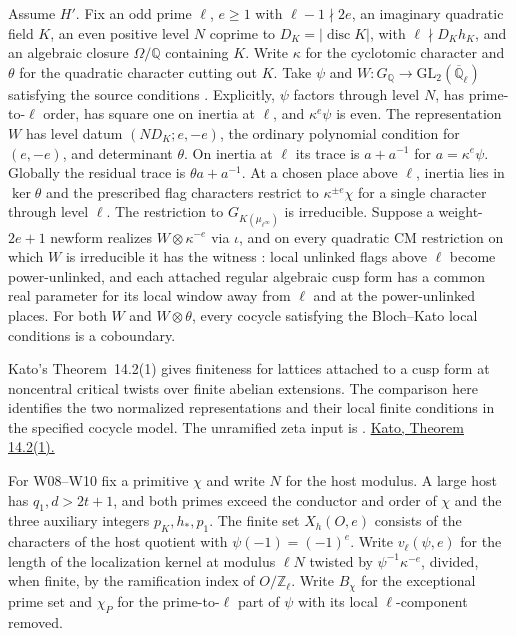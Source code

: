 \begin{formalstatement}\label{sub:W07}
Assume $H'$. Fix an odd prime $\ell$, $e\ge1$ with $\ell-1\nmid2e$,
an imaginary quadratic field $K$, an even positive level $N$ coprime to
$D_K=|\operatorname{disc}K|$, with $\ell\nmid D_K h_K$, and an
algebraic closure $\Omega/\mathbb Q$ containing $K$. Write
$\kappa$ for the cyclotomic character and $\theta$ for the quadratic
character cutting out $K$. Take $\psi$ and $W:G_{\mathbb Q}\to
\mathrm{GL}_2(\overline{\mathbb Q}_\ell)$ satisfying the source
conditions . Explicitly, $\psi$ factors through level $N$,
has prime-to-$\ell$ order, has square one on inertia at $\ell$, and
$\kappa^e\psi$ is even. The representation $W$ has level datum
$(ND_K;e,-e)$, the ordinary polynomial condition for $(e,-e)$, and
determinant $\theta$. On inertia at $\ell$ its trace is
$a+a^{-1}$ for $a=\kappa^e\psi$. Globally the residual trace is
$\theta a+a^{-1}$. At a chosen place above $\ell$, inertia lies
in $\ker\theta$ and the prescribed flag characters restrict to
$\kappa^{\pm e}\chi$ for a single character through level $\ell$.
The restriction to $G_{K(\mu_{\ell^\infty})}$ is irreducible.
Suppose a weight-$2e+1$ newform realizes $W\otimes\kappa^{-e}$
via $\iota$, and on every quadratic CM restriction on which $W$ is
irreducible it has the witness : local unlinked flags
above $\ell$ become power-unlinked, and each attached regular
algebraic cusp form has a common real parameter for its local window
away from $\ell$ and at the power-unlinked places. For both $W$ and $W\otimes\theta$, every cocycle satisfying the
Bloch--Kato local conditions is a coboundary.
\end{formalstatement}
Kato's Theorem~14.2(1) gives finiteness for lattices attached to a cusp
form at noncentral critical twists over finite abelian extensions.
The comparison here identifies the two normalized representations and
their local finite conditions in the specified cocycle model.
The unramified zeta input is .
\href{https://www.numdam.org/item/AST_2004__295__117_0/}{Kato, Theorem 14.2(1).}~\cite{r21-kato}

For W08--W10 fix a primitive $\chi$ and write $N$ for the host modulus.
A large host has $q_1,d>2t+1$, and both primes exceed the conductor and
order of $\chi$ and the three auxiliary integers $p_K,h_*,p_1$.
The finite set $X_h(O,e)$ consists of the characters of the host quotient
with $\psi(-1)=(-1)^e$. Write $v_\ell(\psi,e)$ for the length of the
localization kernel at modulus $\ell N$ twisted by
$\psi^{-1}\kappa^{-e}$, divided, when finite, by the ramification
index of $O/\mathbb Z_\ell$. Write $B_\chi$ for the exceptional
prime set and $\chi_P$ for the prime-to-$\ell$ part of $\psi$ with
its local $\ell$-component removed.

